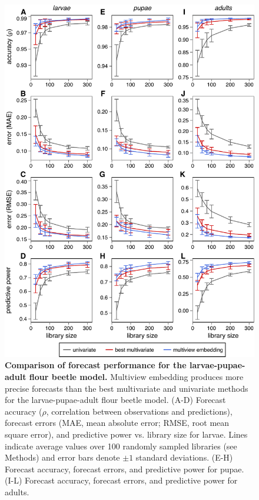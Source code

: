 \begin{figure}[!ht]
\begin{center}\includegraphics[scale = 0.65]{fig_multiembed_ed_3.pdf}\end{center}
\caption[Comparison of forecast performance for the larvae-pupae-adult flour beetle model.]{\textbf{Comparison of forecast performance for the larvae-pupae-adult flour beetle model.}\newline
Multiview embedding produces more precise forecasts than the best multivariate and univariate methods for the larvae-pupae-adult flour beetle model. (A-D) Forecast accuracy ($\rho$, correlation between observations and predictions), forecast errors (MAE, mean absolute error; RMSE, root mean square error), and predictive power vs. library size for larvae. Lines indicate average values over 100 randomly sampled libraries (see Methods) and error bars denote $\pm 1$ standard deviations. (E-H) Forecast accuracy, forecast errors, and predictive power for pupae. (I-L) Forecast accuracy, forecast errors, and predictive power for adults.}
\label{fig_multiembed_ed_3}
\end{figure}


